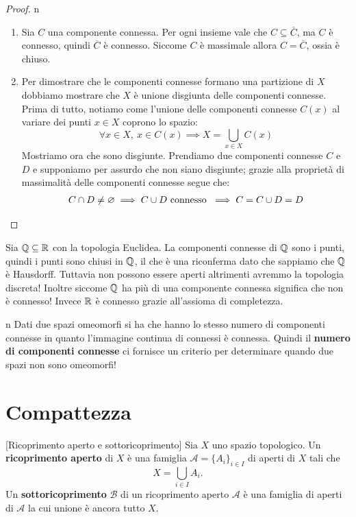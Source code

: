 \begin{proof}{n}~{}
	\begin{enumerate}[label=\Roman*]
		\item Sia $C$ una componente connessa. Per ogni insieme vale che $C\subseteq\overline{C}$, ma $C$ è connesso, quindi $\overline{C}$ è connesso. Siccome $C$ è massimale allora $C=\overline{C}$, ossia è chiuso.
		\item Per dimostrare che le componenti connesse formano una partizione di $X$ dobbiamo mostrare che $X$ è unione disgiunta delle componenti connesse. Prima di tutto, notiamo come l'unione delle componenti connesse $C\left(x\right)$ al variare dei punti $x\in X$ coprono lo spazio:
			\begin{equation*}
				\forall x\in X,\ x\in C(x) \implies X=\bigcup_{x\in X}C(x)
			\end{equation*}
		Mostriamo ora che sono disgiunte. Prendiamo due componenti connesse $C$ e $D$ e supponiamo per assurdo che non siano disgiunte; grazie alla proprietà di massimalità delle componenti connesse segue che:
		\begin{gather*}
			C\cap D\neq\emptyset \implies C\cup D \text{ connesso } \implies C=C\cup D=D\qedhere
		\end{gather*}
	\end{enumerate}
\end{proof}
\begin{example}{}
	Sia $\Q\subseteq\R$ con la topologia Euclidea. La componenti connesse di $\Q$ sono i punti, quindi i punti sono chiusi in $\Q$, il che è una riconferma dato che sappiamo che $\Q$ è Hausdorff. Tuttavia non possono essere aperti altrimenti avremmo la topologia discreta!	Inoltre siccome $\Q$ ha più di una componente connessa significa che non è connesso! Invece $\R$ è connesso grazie all'assioma di completezza.
\end{example}
\begin{remark}{n}
	Dati due spazi omeomorfi si ha che hanno lo stesso numero di componenti connesse in quanto l'immagine continua di connessi è connessa. Quindi il \textbf{numero di componenti connesse} ci fornisce un criterio per determinare quando due spazi non sono omeomorfi!
\end{remark}


		\section{Compattezza}
\begin{definition}{}[Ricoprimento aperto e sottoricoprimento]
	Sia $X$ uno spazio topologico. Un \textbf{ricoprimento aperto} di $X$ è una famiglia $\mathcal{A}=\{A_i \}_{i\in I}$ di aperti di $X$ tali che
	\begin{equation*}
		 X=\bigcup_{i\in I} A_i.
	\end{equation*}
	Un \textbf{sottoricoprimento} $\mathcal{B}$ di un ricoprimento aperto $\mathcal{A}$ è una famiglia di aperti di $\mathcal{A}$ la cui unione è ancora tutto $X$.
\end{definition}		

